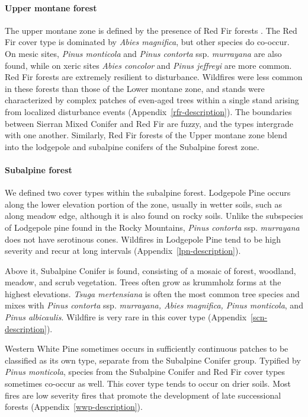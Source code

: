 \paragraph{Upper montane forest} The upper montane zone is defined by the presence of Red Fir forests \citep{Potter1998}. The Red Fir cover type is dominated by \emph{Abies magnifica}, but other species do co-occur. On mesic sites, \emph{Pinus monticola} and \emph{Pinus contorta} ssp. \emph{murrayana} are also found, while on xeric sites \emph{Abies concolor} and \emph{Pinus jeffreyi} are more common. Red Fir forests are extremely resilient to disturbance. Wildfires were less common in these forests than those of the Lower montane zone, and stands were characterized by complex patches of even-aged trees within a single stand arising from localized disturbance events (Appendix~\ref{rfr-description}). The boundaries between Sierran Mixed Conifer and Red Fir are fuzzy, and the types intergrade with one another. Similarly, Red Fir forests of the Upper montane zone blend into the lodgepole and subalpine conifers of the Subalpine forest zone.


\paragraph{Subalpine forest} We defined two cover types within the subalpine forest. Lodgepole Pine occurs along the lower elevation portion of the zone, usually in wetter soils, such as along meadow edge, although it is also found on rocky soils. Unlike the subspecies of Lodgepole pine found in the Rocky Mountains, \emph{Pinus contorta} ssp. \emph{murrayana} does not have serotinous cones. Wildfires in Lodgepole Pine tend to be high severity and recur at long intervals (Appendix~\ref{lpn-description}).%

Above it, Subalpine Conifer is found, consisting of a mosaic of forest, woodland, meadow, and scrub vegetation. Trees often grow as krummholz forms at the highest elevations. \emph{Tsuga mertensiana} is often the most common tree species and mixes with \emph{Pinus contorta} ssp. \emph{murrayana, Abies magnifica, Pinus monticola}, and \emph{Pinus albicaulis}. Wildfire is very rare in this cover type (Appendix~\ref{scn-description}). 

Western White Pine sometimes occurs in sufficiently continuous patches to be classified as its own type, separate from the Subalpine Conifer group. Typified by \emph{Pinus monticola}, species from the Subalpine Conifer and Red Fir cover types sometimes co-occur as well. This cover type tends to occur on drier soils. Most fires are low severity fires that promote the development of late successional forests (Appendix~\ref{wwp-description}).



